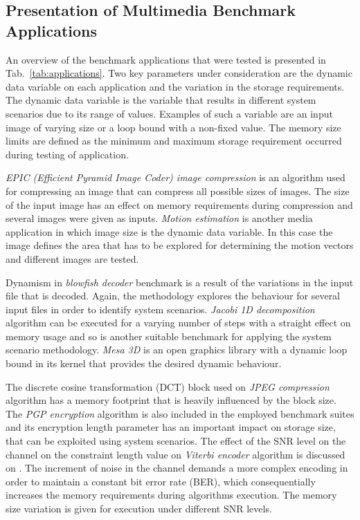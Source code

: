 \documentclass{acm_proc_article-sp}
\begin{document}
\subsection{Presentation of Multimedia Benchmark Applications}

An overview of the benchmark applications that were tested is presented in Tab.~\ref{tab:applications}. Two key parameters under consideration are the dynamic data variable on each application and the variation in the storage requirements. The dynamic data variable is the variable that results in different system scenarios due to its range of values. Examples of such a variable are an input image of varying size or a loop bound with a non-fixed value. The memory size limits are defined as the minimum and maximum storage requirement occurred during testing of application.

\textit{EPIC (Efficient Pyramid Image Coder) image compression} is an algorithm used for compressing an image that can compress all possible sizes of images. The size of the input image has an effect on memory requirements during compression and several images were given as inputs. \textit{Motion estimation} is another media application in which image size is the dynamic data variable. In this case the image defines the area that has to be explored for determining the motion vectors and different images are tested.

Dynamism in \textit{blowfish decoder} benchmark is a result of the variations in the input file that is decoded. Again, the methodology explores the behaviour for several input files in order to identify system scenarios. \textit{Jacobi 1D decomposition} algorithm can be executed for a varying number of steps with a straight effect on memory usage and so is another suitable benchmark for applying the system scenario methodology. \textit{Mesa 3D} is an open graphics library with a dynamic loop bound in its kernel that provides the desired dynamic behaviour. 

The discrete cosine transformation (DCT) block used on \textit{JPEG compression} algorithm has a memory footprint that is heavily influenced by the block size. The \textit{PGP encryption} algorithm is also included in the employed benchmark suites and its encryption length parameter has an important impact on storage size, that can be exploited using system scenarios. The effect of the SNR level on the channel on the constraint length value on \textit{Viterbi encoder} algorithm is discussed on \cite{Fil12}. The increment of noise in the channel demands a more complex encoding in order to maintain a constant bit error rate (BER), which consequentially increases the memory requirements during algorithms execution. The memory size variation is given for execution under different SNR levels.  
\end{document}
